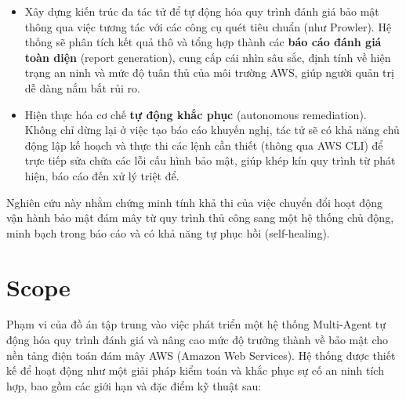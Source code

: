 \begin{itemize}
  \item Xây dựng kiến trúc đa tác tử để tự động hóa quy trình đánh giá bảo mật thông qua việc tương tác với các công cụ quét tiêu chuẩn (như Prowler). Hệ thống sẽ phân tích kết quả thô và tổng hợp thành các \textbf{báo cáo đánh giá toàn diện} (report generation), cung cấp cái nhìn sâu sắc, định tính về hiện trạng an ninh và mức độ tuân thủ của môi trường AWS, giúp người quản trị dễ dàng nắm bắt rủi ro.
  \item Hiện thực hóa cơ chế \textbf{tự động khắc phục} (autonomous remediation). Không chỉ dừng lại ở việc tạo báo cáo khuyến nghị, tác tử sẽ có khả năng chủ động lập kế hoạch và thực thi các lệnh cần thiết (thông qua AWS CLI) để trực tiếp sửa chữa các lỗi cấu hình bảo mật, giúp khép kín quy trình từ phát hiện, báo cáo đến xử lý triệt để.
\end{itemize}

Nghiên cứu này nhằm chứng minh tính khả thi của việc chuyển đổi hoạt động vận hành bảo mật đám mây từ quy trình thủ công sang một hệ thống chủ động, minh bạch trong báo cáo và có khả năng tự phục hồi (self-healing).
\section{Scope}

Phạm vi của đồ án tập trung vào việc phát triển một hệ thống Multi-Agent tự động hóa quy trình đánh giá và nâng cao mức độ trưởng thành về bảo mật cho nền tảng điện toán đám mây AWS (Amazon Web Services). Hệ thống được thiết kế để hoạt động như một giải pháp kiểm toán và khắc phục sự cố an ninh tích hợp, bao gồm các giới hạn và đặc điểm kỹ thuật sau:

